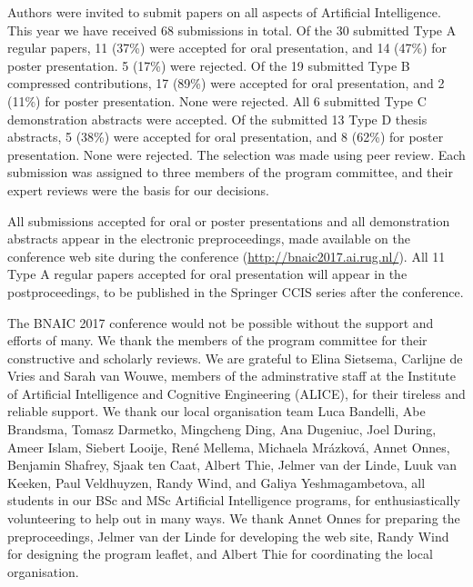 \noindent Authors were invited to submit papers on all aspects of Artificial Intelligence. This year we have received 68 submissions in total. Of the 30 submitted Type A regular papers, 11 (37\%) were accepted for oral presentation, and 14 (47\%) for poster presentation. 5 (17\%) were rejected. Of the 19 submitted Type B compressed contributions, 17 (89\%) were accepted for oral presentation, and 2 (11\%) for poster presentation. None were rejected. All 6 submitted Type C demonstration abstracts were accepted. Of the submitted 13 Type D thesis abstracts, 5 (38\%) were accepted for oral presentation, and 8 (62\%) for poster presentation. None were rejected. The selection was made using peer review. Each submission was assigned to three members of the program committee, and their expert reviews were the basis for our decisions. 

All submissions accepted for oral or poster presentations and all demonstration abstracts appear in the electronic preproceedings, made available on the conference web site during the conference (\url{http://bnaic2017.ai.rug.nl/}). All 11 Type A regular papers accepted for oral presentation will appear in the postproceedings, to be published in the Springer CCIS series after the conference.

The BNAIC 2017 conference would not be possible without the support and efforts of many. We thank the members of the program committee for their constructive and scholarly reviews. We are grateful to 
    Elina Sietsema, Carlijne de Vries and 
		Sarah van Wouwe, members of the adminstrative staff at the Institute of Artificial Intelligence and Cognitive Engineering (ALICE), for their tireless and reliable support. We thank our local organisation team 
		Luca Bandelli,
    Abe Brandsma,
    Tomasz Darmetko,
    Mingcheng Ding,
    Ana Dugeniuc,
    Joel During,
    Ameer Islam,
    Siebert Looije,
    Ren\'{e} Mellema,
    Michaela Mr\'{a}zkov\'{a},
    Annet Onnes,
    Benjamin Shafrey,
    Sjaak ten Caat,
    Albert Thie,
    Jelmer van der Linde,
    Luuk van Keeken,
    Paul Veldhuyzen,
    Randy Wind, and
    Galiya Yeshmagambetova, 
all students in our BSc and MSc Artificial Intelligence programs, for enthusiastically volunteering to help out in many ways. We thank Annet Onnes for preparing the preproceedings, Jelmer van der Linde for developing the web site, Randy Wind for designing the program leaflet, and Albert Thie for coordinating the local organisation.
		
